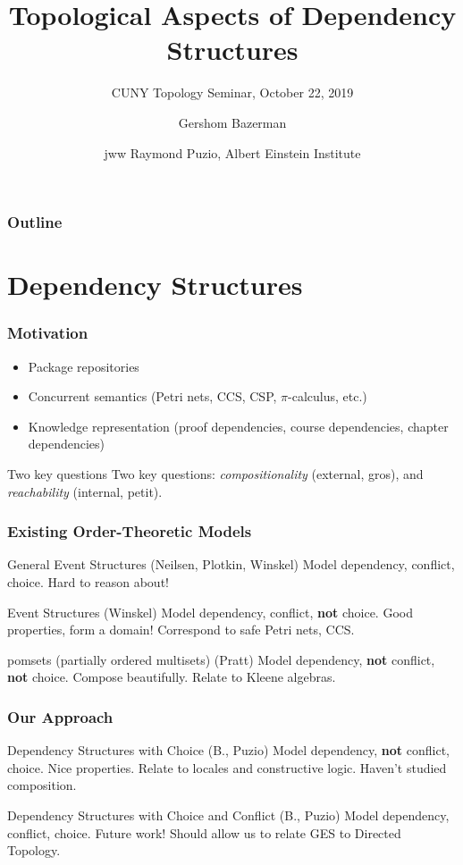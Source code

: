\documentclass{beamer}
\title{Topological Aspects of Dependency Structures}
\subtitle{CUNY Topology Seminar, October 22, 2019}
\author{Gershom Bazerman}
\date{}
\institute{Awake Security}
\date[\today]{ \tiny{jww Raymond Puzio, Albert Einstein Institute}}
\begin{document}
\begin{frame}
		\titlepage
\end{frame}
\begin{frame}
\frametitle{Outline}
\tableofcontents
\end{frame}

\section{Dependency Structures}

\begin{frame}
\frametitle{Motivation}
\begin{itemize}
\item Package repositories
\item Concurrent semantics (Petri nets, CCS, CSP, \(\pi\)-calculus, etc.)
\item Knowledge representation (proof dependencies, course dependencies, chapter dependencies)
\end{itemize}
\begin{block}{Two key questions}
Two key questions: \textit{compositionality} (external, gros), and \textit{reachability} (internal, petit).
\end{block}
\end{frame}

\begin{frame}
\frametitle{Existing Order-Theoretic Models}
\begin{block}{General Event Structures (Neilsen, Plotkin, Winskel)}
Model dependency, conflict, choice. Hard to reason about!
\end{block}
\begin{block}{Event Structures (Winskel)}
Model dependency, conflict, \textbf{not} choice. Good properties, form a domain! Correspond to safe Petri nets, CCS.
\end{block}
\begin{block}{pomsets (partially ordered multisets) (Pratt)}
Model dependency, \textbf{not} conflict, \textbf{not} choice. Compose beautifully. Relate to Kleene algebras.
\end{block}
\end{frame}

\begin{frame}
\frametitle{Our Approach}
\begin{block}{Dependency Structures with Choice (B., Puzio)}
Model dependency, \textbf{not} conflict, choice. Nice properties. Relate to locales and constructive logic. Haven't studied composition.
\end{block}
\begin{block}{Dependency Structures with Choice and Conflict (B., Puzio)}
Model dependency, conflict, choice. Future work! Should allow us to relate GES to Directed Topology.
\end{block}
\end{frame}
\end{document}
